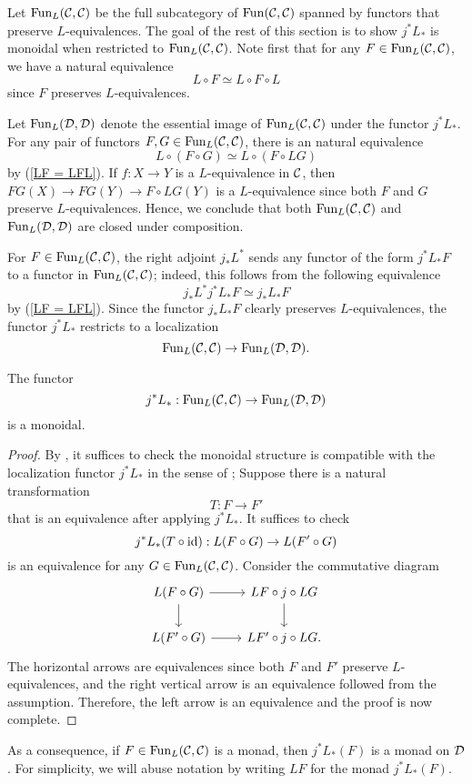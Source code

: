 Let $\operatorname{Fun}_L({\mathcal{C}},{\mathcal{C}})$ be the full subcategory of $\operatorname{Fun}({\mathcal{C}},{\mathcal{C}})$ spanned by functors that preserve $L$-equivalences. 
The goal of the rest of this section is to show $j^*L_*$ is monoidal when restricted to $\operatorname{Fun}_L({\mathcal{C}},{\mathcal{C}})$.
Note first that for any $F\in \operatorname{Fun}_L({\mathcal{C}},{\mathcal{C}})$, we have a natural equivalence
\begin{equation}
\label{LF = LFL}
	L\circ F \simeq L\circ F\circ L
\end{equation}
since $F$ preserves $L$-equivalences.
\begin{remark}
Let $\operatorname{Fun}_L({\mathcal{D}},{\mathcal{D}})$ denote the essential image of $\operatorname{Fun}_L({\mathcal{C}},{\mathcal{C}})$ under the functor $j^*L_*$.
For any pair of functors $F,G\in \operatorname{Fun}_L({\mathcal{C}},{\mathcal{C}})$, there is an natural equivalence
$$
L\circ (F\circ G) \simeq L\circ (F\circ L G)
$$ 
by (\ref{LF = LFL}).
If $f:X\to Y$ is a $L$-equivalence in ${\mathcal{C}}$, then
$FG(X) \to FG(Y) \to F\circ LG(Y)$ is a $L$-equivalence since both $F$ and $G$ preserve $L$-equivalences.
Hence, we conclude that both $\operatorname{Fun}_L({\mathcal{C}},{\mathcal{C}})$ and $\operatorname{Fun}_L({\mathcal{D}},{\mathcal{D}})$ are closed under composition.
\end{remark}

For $F\in \operatorname{Fun}_{L}({\mathcal{C}},{\mathcal{C}})$, the right adjoint $j_*L^*$ sends any functor of the form $j^*L_*F$ to a functor in $\operatorname{Fun}_L({\mathcal{C}},{\mathcal{C}})$; indeed, this follows from the following equivalence
$$
j_*L^*j^*L_* F \simeq j_*L_*F
$$
by (\ref{LF = LFL}).
Since the functor $j_*L_*F$ clearly preserves $L$-equivalences, the functor $j^*L_*$ restricts to a localization
$$
\operatorname{Fun}_L({\mathcal{C}},{\mathcal{C}}) 
	\to 
	\operatorname{Fun}_L({\mathcal{D}},{\mathcal{D}}).
$$
\begin{lemma}
\label{j^*L_* is monoidal when restricted to Fun_L}
	The functor
	$$
	j^*L_*:\operatorname{Fun}_L({\mathcal{C}},{\mathcal{C}}) 
	\to 
	\operatorname{Fun}_L({\mathcal{D}},{\mathcal{D}})
	$$
	is a monoidal.
\end{lemma}
\begin{proof}
By \cite[Proposition 2.2.1.9.]{HA}, it suffices to check the monoidal structure is compatible with the localization functor $j^*L_*$ in the sense of \cite[Definition 2.2.1.6.]{HA};
	Suppose there is a natural transformation 
$$
T: F \to F'
$$
that is an equivalence after applying $j^*L_*$. 
It suffices to check
$$
j^*L_*(T\circ \operatorname{id}):
L(F\circ G) \to 
L(F'\circ G)
$$ 
is an equivalence for any $G\in \operatorname{Fun}_L({\mathcal{C}},{\mathcal{C}}) $.
Consider the commutative diagram
\[
\begin{tikzcd}
L(F\circ G) & LF \circ j\circ LG\\
L(F'\circ G) & LF' \circ j\circ LG.
    \arrow[from=1-1, to=1-2]
	\arrow[from=1-1, to=2-1]
	\arrow[from=2-1, to=2-2]
	\arrow[from=1-2, to=2-2]
\end{tikzcd}
\]
The horizontal arrows are equivalences since both $F$ and $F'$ preserve $L$-equivalences, and the right vertical arrow is an equivalence followed from the assumption.
Therefore, the left arrow is an equivalence and the proof is now complete.
\end{proof}
\begin{remark}
\label{j^*L_* is monoidal on Fun_L}
As a consequence, if $F\in \operatorname{Fun}_{L}({\mathcal{C}},{\mathcal{C}})$ is a monad, then 
$j^*L_*(F)$ is a monad on ${\mathcal{D}}$. For simplicity, we will abuse notation by writing $LF$ for the monad $j^*L_*(F)$.
\end{remark}

